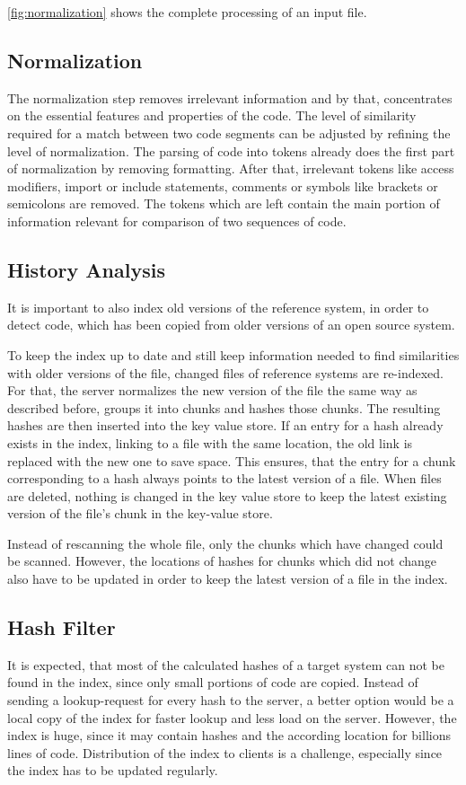 \autoref{fig:normalization} shows the complete processing of an input file.

\subsection{Normalization}\label{section:approach/creating_index/normalization}
The normalization step removes irrelevant information and by that, concentrates on the essential features and properties of the code.
The level of similarity required for a match between two code segments can be adjusted by refining the level of normalization.
The parsing of code into tokens already does the first part of normalization by removing formatting.
After that, irrelevant tokens like access modifiers, import or include statements, comments or symbols like brackets or semicolons are removed.
The tokens which are left contain the main portion of information relevant for comparison of two sequences of code.

\subsection{History Analysis}\label{section:approach/creating_index/history_analysis}
It is important to also index old versions of the reference system, in order to detect code, which has been copied from older versions of an open source system.

To keep the index up to date and still keep information needed to find similarities with older versions of the file, changed files of reference systems are re-indexed.
For that, the server normalizes the new version of the file the same way as described before, groups it into chunks and hashes those chunks.
The resulting hashes are then inserted into the key value store.
If an entry for a hash already exists in the index, linking to a file with the same location, the old link is replaced with the new one to save space.
This ensures, that the entry for a chunk corresponding to a hash always points to the latest version of a file.
When files are deleted, nothing is changed in the key value store to keep the latest existing version of the file's chunk in the key-value store.

Instead of rescanning the whole file, only the chunks which have changed could be scanned.
However, the locations of hashes for chunks which did not change also have to be updated  in order to keep the latest version of a file in the index.

\subsection{Hash Filter}\label{section:approach/creating_index/hash_filter}
It is expected, that most of the calculated hashes of a target system can not be found in the index, since only small portions of code are copied.
Instead of sending a lookup-request for every hash to the server, a better option would be a local copy of the index for faster lookup and less load on the server.
However, the index is huge, since it may contain hashes and the according location for billions lines of code.
Distribution of the index to clients is a challenge, especially since the index has to be updated regularly.

